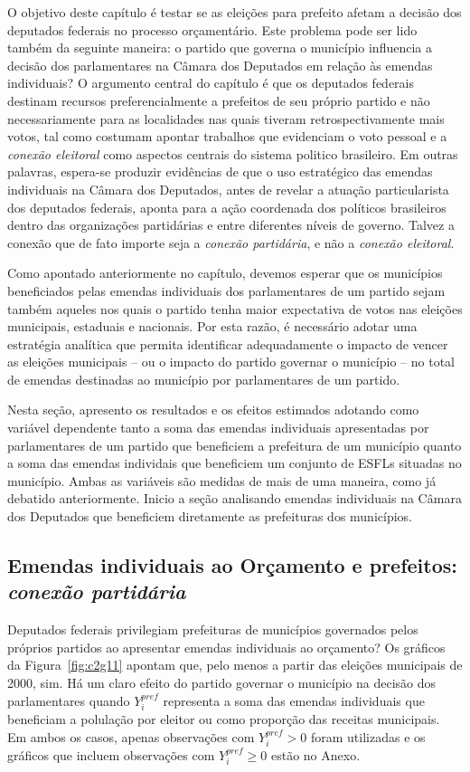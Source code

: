 O objetivo deste capítulo é testar se as eleições para prefeito afetam a decisão dos deputados federais no processo orçamentário. Este problema pode ser lido também da seguinte maneira: o partido que governa o município influencia a decisão dos parlamentares na Câmara dos Deputados em relação às emendas individuais? O argumento central do capítulo é que os deputados federais destinam recursos preferencialmente a prefeitos de seu próprio partido e não necessariamente para as localidades nas quais tiveram retrospectivamente mais votos, tal como costumam apontar trabalhos que evidenciam o voto pessoal e a \emph{conexão eleitoral} como aspectos centrais do sistema politico brasileiro. Em outras palavras, espera-se produzir evidências de que o uso estratégico das emendas individuais na Câmara dos Deputados, antes de revelar a atuação particularista dos deputados federais, aponta para a ação coordenada dos políticos brasileiros dentro das organizações partidárias e entre diferentes níveis de governo. Talvez a conexão que de fato importe seja a \emph{conexão partidária}, e não a \emph{conexão eleitoral}.

Como apontado anteriormente no capítulo, devemos esperar que os municípios beneficiados pelas emendas individuais dos parlamentares de um partido sejam também aqueles nos quais o partido tenha maior expectativa de votos nas eleições municipais, estaduais e nacionais. Por esta razão, é necessário adotar uma estratégia analítica que permita identificar adequadamente o impacto de vencer as eleições municipais -- ou o impacto do partido governar o município -- no total de emendas destinadas ao município por parlamentares de um partido. 

Nesta seção, apresento os resultados e os efeitos estimados adotando como variável dependente tanto a soma das emendas individuais apresentadas por parlamentares de um partido que beneficiem a prefeitura de um município quanto a soma das emendas individais que beneficiem um conjunto de ESFLs situadas no município. Ambas as variáveis são medidas de mais de uma maneira, como já debatido anteriormente. Inicio a seção analisando emendas individuais na Câmara dos Deputados que beneficiem diretamente as prefeituras dos municípios. 

\subsection{Emendas individuais ao Orçamento e prefeitos: \emph{conexão partidária}} 

Deputados federais privilegiam prefeituras de municípios governados pelos próprios partidos ao apresentar emendas individuais ao orçamento? Os gráficos da Figura~\ref{fig:c2g11} apontam que, pelo menos a partir das eleições municipais de 2000, sim. Há um claro efeito do partido governar o município na decisão dos parlamentares quando $Y_{i}^{pref}$ representa a soma das emendas individuais que beneficiam a polulação por eleitor ou como proporção das receitas municipais. Em ambos os casos, apenas observações com $Y_{i}^{pref}>0$ foram utilizadas e os gráficos que incluem observações com $Y_{i}^{pref} \geq 0$ estão no Anexo.

